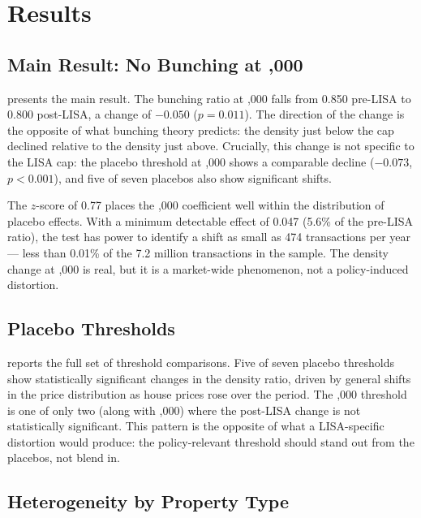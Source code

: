 \documentclass[12pt]{article}
\begin{document}
\section{Results}

\subsection{Main Result: No Bunching at ,000}



 presents the main result. The bunching ratio at ,000 falls from 0.850 pre-LISA to 0.800 post-LISA, a change of $-0.050$ ($p = 0.011$). The direction of the change is the opposite of what bunching theory predicts: the density just below the cap declined relative to the density just above. Crucially, this change is not specific to the LISA cap: the placebo threshold at ,000 shows a comparable decline ($-0.073$, $p < 0.001$), and five of seven placebos also show significant shifts.

The $z$-score of 0.77 places the ,000 coefficient well within the distribution of placebo effects. With a minimum detectable effect of 0.047 (5.6\% of the pre-LISA ratio), the test has power to identify a shift as small as 474 transactions per year --- less than 0.01\% of the 7.2 million transactions in the sample. The density change at ,000 is real, but it is a market-wide phenomenon, not a policy-induced distortion.

\subsection{Placebo Thresholds}



 reports the full set of threshold comparisons. Five of seven placebo thresholds show statistically significant changes in the density ratio, driven by general shifts in the price distribution as house prices rose over the period. The ,000 threshold is one of only two (along with ,000) where the post-LISA change is not statistically significant. This pattern is the opposite of what a LISA-specific distortion would produce: the policy-relevant threshold should stand out from the placebos, not blend in.

\subsection{Heterogeneity by Property Type}
\end{document}
